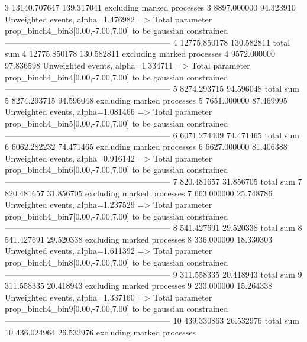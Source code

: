 3          13140.707647    139.317041      excluding marked processes    
3          8897.000000     94.323910       Unweighted events, alpha=1.476982
  => Total parameter prop_binch4_bin3[0.00,-7.00,7.00] to be gaussian constrained
------------------------------------------------------------
4          12775.850178    130.582811      total sum                     
4          12775.850178    130.582811      excluding marked processes    
4          9572.000000     97.836598       Unweighted events, alpha=1.334711
  => Total parameter prop_binch4_bin4[0.00,-7.00,7.00] to be gaussian constrained
------------------------------------------------------------
5          8274.293715     94.596048       total sum                     
5          8274.293715     94.596048       excluding marked processes    
5          7651.000000     87.469995       Unweighted events, alpha=1.081466
  => Total parameter prop_binch4_bin5[0.00,-7.00,7.00] to be gaussian constrained
------------------------------------------------------------
6          6071.274409     74.471465       total sum                     
6          6062.282232     74.471465       excluding marked processes    
6          6627.000000     81.406388       Unweighted events, alpha=0.916142
  => Total parameter prop_binch4_bin6[0.00,-7.00,7.00] to be gaussian constrained
------------------------------------------------------------
7          820.481657      31.856705       total sum                     
7          820.481657      31.856705       excluding marked processes    
7          663.000000      25.748786       Unweighted events, alpha=1.237529
  => Total parameter prop_binch4_bin7[0.00,-7.00,7.00] to be gaussian constrained
------------------------------------------------------------
8          541.427691      29.520338       total sum                     
8          541.427691      29.520338       excluding marked processes    
8          336.000000      18.330303       Unweighted events, alpha=1.611392
  => Total parameter prop_binch4_bin8[0.00,-7.00,7.00] to be gaussian constrained
------------------------------------------------------------
9          311.558335      20.418943       total sum                     
9          311.558335      20.418943       excluding marked processes    
9          233.000000      15.264338       Unweighted events, alpha=1.337160
  => Total parameter prop_binch4_bin9[0.00,-7.00,7.00] to be gaussian constrained
------------------------------------------------------------
10         439.330863      26.532976       total sum                     
10         436.024964      26.532976       excluding marked processes    
